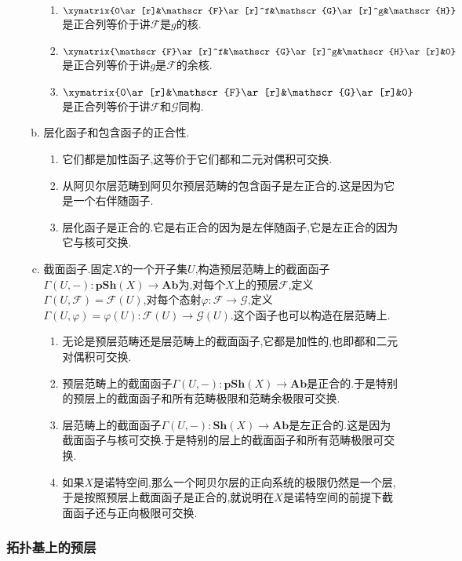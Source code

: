 \begin{enumerate}
\begin{enumerate}[(a)]
\begin{enumerate}[(1)]
			\item $\xymatrix{0\ar[r]&\mathscr{F}\ar[r]^f&\mathscr{G}\ar[r]^g&\mathscr{H}}$是正合列等价于讲$\mathscr{F}$是$g$的核.
			\item $\xymatrix{\mathscr{F}\ar[r]^f&\mathscr{G}\ar[r]^g&\mathscr{H}\ar[r]&0}$是正合列等价于讲$g$是$\mathscr{F}$的余核.
			\item $\xymatrix{0\ar[r]&\mathscr{F}\ar[r]&\mathscr{G}\ar[r]&0}$是正合列等价于讲$\mathscr{F}$和$\mathscr{G}$同构.
		\end{enumerate}
		\item 层化函子和包含函子的正合性.
		\begin{enumerate}[(1)]
			\item 它们都是加性函子,这等价于它们都和二元对偶积可交换.
			\item 从阿贝尔层范畴到阿贝尔预层范畴的包含函子是左正合的.这是因为它是一个右伴随函子.
			\item 层化函子是正合的.它是右正合的因为是左伴随函子,它是左正合的因为它与核可交换.
		\end{enumerate}
		\item 截面函子.固定$X$的一个开子集$U$,构造预层范畴上的截面函子$\Gamma(U,-):\textbf{pSh}(X)\to\textbf{Ab}$为,对每个$X$上的预层$\mathscr{F}$,定义$\Gamma(U,\mathscr{F})=\mathscr{F}(U)$,对每个态射$\varphi:\mathscr{F}\to\mathscr{G}$,定义$\Gamma(U,\varphi)=\varphi(U):\mathscr{F}(U)\to\mathscr{G}(U)$.这个函子也可以构造在层范畴上.
		\begin{enumerate}[(1)]
			\item 无论是预层范畴还是层范畴上的截面函子,它都是加性的,也即都和二元对偶积可交换.
			\item 预层范畴上的截面函子$\Gamma(U,-):\textbf{pSh}(X)\to\textbf{Ab}$是正合的.于是特别的预层上的截面函子和所有范畴极限和范畴余极限可交换.
			\item 层范畴上的截面函子$\Gamma(U,-):\textbf{Sh}(X)\to\textbf{Ab}$是左正合的.这是因为截面函子与核可交换.于是特别的层上的截面函子和所有范畴极限可交换.
			\item 如果$X$是诺特空间,那么一个阿贝尔层的正向系统的极限仍然是一个层,于是按照预层上截面函子是正合的,就说明在$X$是诺特空间的前提下截面函子还与正向极限可交换.
		\end{enumerate}
	\end{enumerate}
\end{enumerate}
\subsubsection{拓扑基上的预层}


